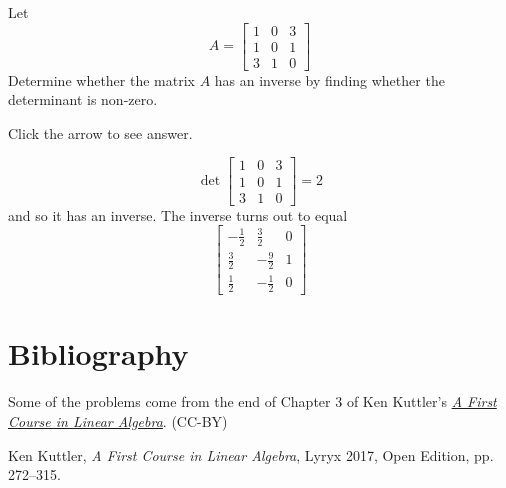 \documentclass{ximera}
\begin{document}
\begin{problem}\label{prb:7.30} Let
\begin{equation*}
A =
\left[
\begin{array}{rrr}
1 & 0 & 3 \\
1 & 0 & 1 \\
3 & 1 & 0
\end{array}
\right]
\end{equation*}
Determine whether the matrix $A$ has an inverse by finding whether the
determinant is non-zero. 

Click the arrow to see answer.
\begin{expandable}
\[
\det \left[
\begin{array}{rrr}
1 & 0 & 3 \\
1 & 0 & 1 \\
3 & 1 & 0
\end{array}
\right] = 2
\]
and so it has an inverse. The inverse turns out to equal
\[
\left[
\begin{array}{rrr}
-\frac{1}{2} & \frac{3}{2} & 0 \\
\frac{3}{2} & -\frac{9}{2} & 1 \\
\frac{1}{2} & -\frac{1}{2} & 0
\end{array}
\right]
\]
\end{expandable}
\end{problem}



\section*{Bibliography}
Some of the problems come from the end of Chapter 3 of Ken Kuttler's \href{https://open.umn.edu/opentextbooks/textbooks/a-first-course-in-linear-algebra-2017}{\it A First Course in Linear Algebra}. (CC-BY)

Ken Kuttler, {\it  A First Course in Linear Algebra}, Lyryx 2017, Open Edition, pp. 272--315.  
\end{document}
